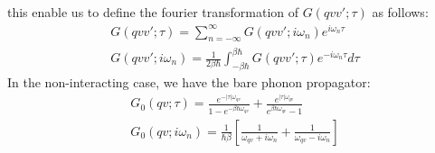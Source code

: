 \documentclass{article}
\begin{document}
this enable us to define the fourier transformation of $G(qvv';\tau )$ as follows:
\begin{align}
    G(qvv';\tau) = \sum_{n = - \infty}^{\infty} G(qvv';i\omega_n) e^{i\omega_n\tau} \\
    G(qvv';i\omega_n) = \frac{1}{2\beta\hbar} \int_{-\beta\hbar}^{\beta\hbar} G(qvv';\tau) e^{-i\omega_n\tau} d\tau
\end{align} 
In the non-interacting case, we have the bare phonon propagator:
\begin{align}
    G_0(qv;\tau) = \frac{e^{-|\tau|\omega_{qv}}}{1-e^{-\beta\hbar\omega_{qv}}} + \frac{e^{|\tau|\omega_{qv}}}{e^{\beta\hbar\omega_{qv}}-1} \\
    G_0(qv;i\omega_n) = \frac{1}{\hbar\beta}\left[ \frac{1}{\omega_{qv}+i\omega_n} + \frac{1}{\omega_{qv}-i\omega_n} \right]
\end{align}
\end{document}
